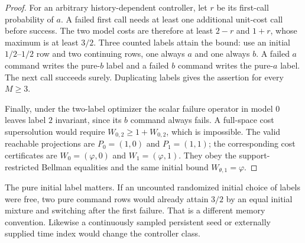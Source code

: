 \begin{proof}
For an arbitrary history-dependent controller, let $r$ be its first-call
probability of $a$.  A failed first call needs at least one additional
unit-cost call before success.  The two model costs are therefore at least
$2-r$ and $1+r$, whose maximum is at least $3/2$.  Three counted labels
attain the bound: use an initial $1/2$--$1/2$ row and two continuing rows,
one always $a$ and one always $b$.  A failed $a$ command writes the pure-$b$
label and a failed $b$ command writes the pure-$a$ label.  The next call
succeeds surely.  Duplicating labels gives the assertion for every $M\ge3$.

Finally, under the two-label optimizer the scalar failure operator in
model $0$ leaves label $2$ invariant, since its $b$ command always fails.
A full-space cost supersolution would require $W_{0,2}\ge1+W_{0,2}$,
which is impossible.  The valid reachable projections are
$P_0=(1,0)$ and $P_1=(1,1)$; the corresponding cost certificates are
$W_0=(\varphi,0)$ and $W_1=(\varphi,1)$.  They obey the support-restricted
Bellman equalities and the same initial bound $W_{\theta,1}=\varphi$.
\end{proof}

The pure initial label matters.  If an uncounted randomized initial
choice of labels were free, two pure command rows would already attain
$3/2$ by an equal initial mixture and switching after the first failure.
That is a different memory convention.  Likewise a continuously sampled
persistent seed or externally supplied time index would change the
controller class.


